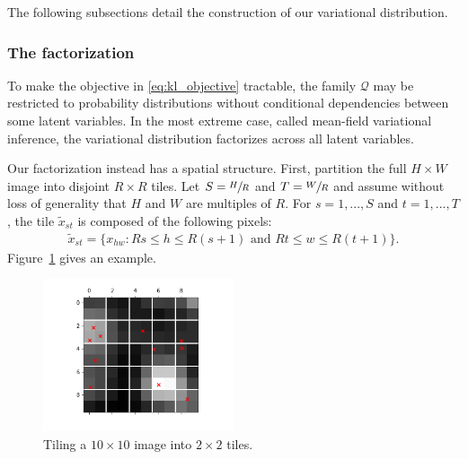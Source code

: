 The following subsections detail the construction of our variational distribution. 

\subsubsection{The factorization}
\label{sec:factorization}
To make the objective in \eqref{eq:kl_objective} tractable, the family $\mathcal{Q}$ may be restricted to probability distributions 
without conditional dependencies between some latent variables. In the most extreme case, called mean-field variational inference, the variational distribution factorizes across all latent variables. 

Our factorization instead has a spatial structure. First, partition the full $H \times W$ image into disjoint $R \times R$ tiles. 
Let $S = \sfrac{H}{R}$ and $T = \sfrac{W}{R}$ and assume without loss of generality that $H$ and $W$ are multiples of $R$.
For $s = 1, ..., S$ and $t = 1, ..., T$,
the tile $\tilde x_{st}$ is composed of the following pixels:
\begin{align}
    \tilde x_{st} = \{x_{hw} : Rs \leq h \leq R(s+1) \text{ and } Rt \leq w \leq R(t+1)\}.
    \label{eq:tiles}
\end{align}
Figure~\ref{fig:ex_tiles} gives an example.
\begin{figure}[!ht]
    \centering
    \includegraphics[width = 0.5\textwidth]{figures/example_tiled.png}
    \vspace{-1cm}
    \caption{Tiling a $10 \times 10$ image into $2 \times 2$ tiles.}
    \label{fig:ex_tiles}
\end{figure}

